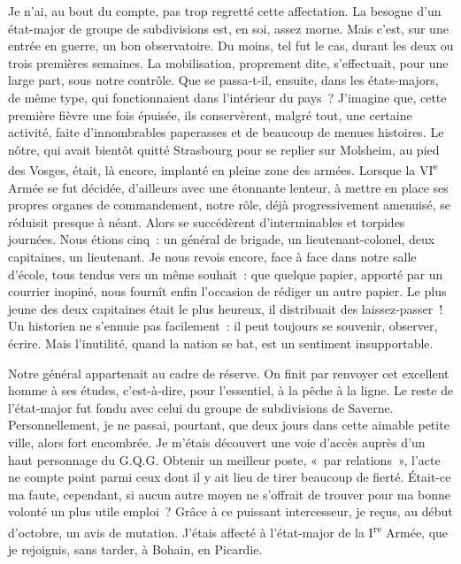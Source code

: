 \documentclass[french,twoside]{book} %
\begin{document}
Je n’ai, au bout du compte, pas trop regretté cette affectation. La besogne d’un état-major de groupe de subdivisions est, en soi, assez morne. Mais c’est, sur une entrée en guerre, un bon observatoire. Du moins, tel fut le cas, durant les deux ou trois premières semaines. La mobilisation, proprement dite, s’effectuait, pour une large part, sous notre contrôle. Que se passa-t-il, ensuite, dans les états-majors, de même type, qui fonctionnaient dans l’intérieur du pays ? J’imagine que, cette première fièvre une fois épuisée, ils conservèrent, malgré tout, une certaine activité, faite d’innombrables paperasses et de beaucoup de menues histoires. Le nôtre, qui avait bientôt quitté Strasbourg pour se replier sur Molsheim, au pied des Vosges, était, là encore, implanté en pleine zone des armées. Lorsque la VI\textsuperscript{e} Armée se fut décidée, d’ailleurs avec une étonnante lenteur, à mettre   en place ses propres organes de commandement, notre rôle, déjà progressivement amenuisé, se réduisit presque à néant. Alors se succédèrent d’interminables et torpides journées. Nous étions cinq : un général de brigade, un lieutenant-colonel, deux capitaines, un lieutenant. Je nous revois encore, face à face dans notre salle d’école, tous tendus vers un même souhait : que quelque papier, apporté par un courrier inopiné, nous fournît enfin l’occasion de rédiger un autre papier. Le plus jeune des deux capitaines était le plus heureux, il distribuait des laissez-passer ! Un historien ne s’ennuie pas facilement : il peut toujours se souvenir, observer, écrire. Mais l’inutilité, quand la nation se bat, est un sentiment insupportable.\par
Notre général appartenait au cadre de réserve. On finit par renvoyer cet excellent homme à ses études, c’est-à-dire, pour l’essentiel, à la pêche à la ligne. Le reste de l’état-major fut fondu avec celui du groupe de subdivisions de Saverne. Personnellement, je ne passai, pourtant, que deux jours dans cette aimable petite ville, alors fort encombrée. Je m’étais découvert une voie d’accès auprès d’un haut personnage du G.Q.G. Obtenir un meilleur poste, « par relations », l’acte ne compte point parmi ceux dont il y ait lieu de tirer beaucoup de fierté. Était-ce ma faute, cependant, si aucun autre moyen ne s’offrait de trouver pour ma bonne volonté un plus utile emploi ? Grâce à ce puissant intercesseur, je reçus, au début d’octobre, un avis de mutation. J’étais affecté à l’état-major de la I\textsuperscript{re} Armée, que je rejoignis, sans tarder, à Bohain, en Picardie.\par
\end{document}
